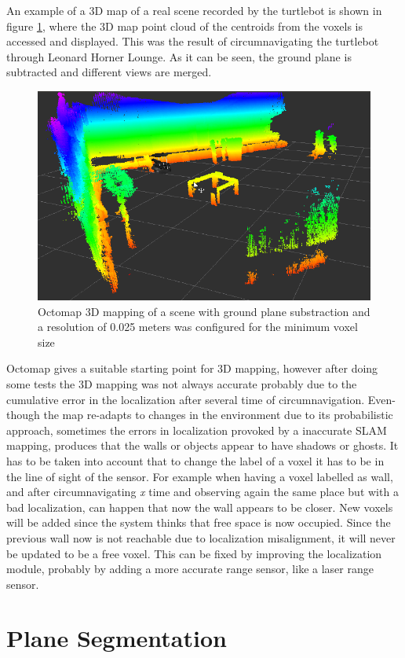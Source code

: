 \documentclass[fontsize=12pt]{article}
\begin{document}
An example of a 3D map of a real scene  recorded by the turtlebot is shown in figure \ref{fig:octoscene}, where the 3D map point cloud of the centroids from the voxels is accessed and displayed. This was the result of circumnavigating the turtlebot through Leonard Horner Lounge. As it can be seen, the ground plane is subtracted and different views are merged. 
\begin{figure}[H]
\begin{center}
\includegraphics[width=0.6\linewidth]{images/figoctomap}
\caption{Octomap 3D mapping of a scene with ground plane substraction and a resolution of 0.025 meters was configured for the minimum voxel size }
\label{fig:octoscene}
\end{center}
\end{figure}

Octomap gives a suitable starting point for 3D mapping, however after doing some tests the 3D mapping was not always accurate probably due to the cumulative error in the localization after several time of circumnavigation. Even-though the map re-adapts to changes in the environment due to its probabilistic approach, sometimes the  errors in localization provoked by a inaccurate SLAM mapping, produces that the walls or objects appear to have shadows or ghosts. It has to be taken into account that to change the label of a voxel it has to be in the line of sight of the sensor. For example when having a voxel labelled as wall, and after circumnavigating \textit{x} time and observing again  the same place but with a bad localization, can happen that now the wall appears to be closer. New voxels will be added since the system thinks that free space is now occupied. Since the previous wall now is not reachable due to localization misalignment, it will never be updated to be a free voxel. This can be fixed by improving the localization module, probably by adding a more accurate range sensor, like a laser range sensor. 
\section{Plane Segmentation}
\label{sec:planeseg} 
\end{document}
